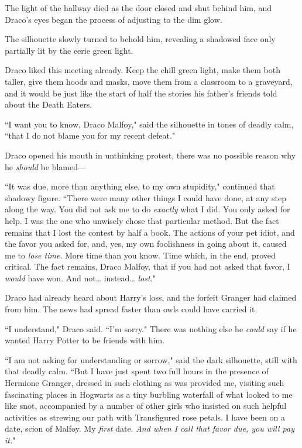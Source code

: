 The light of the hallway died as the door closed and shut behind him, and Draco's eyes began the process of adjusting to the dim glow.

The silhouette slowly turned to behold him, revealing a shadowed face only partially lit by the eerie green light.

Draco liked this meeting already. Keep the chill green light, make them both taller, give them hoods and masks, move them from a classroom to a graveyard, and it would be just like the start of half the stories his father's friends told about the Death Eaters.

``I want you to know, Draco Malfoy," said the silhouette in tones of deadly calm, ``that I do not blame you for my recent defeat."

Draco opened his mouth in unthinking protest, there was no possible reason why he \emph{should} be blamed---

``It was due, more than anything else, to my own stupidity," continued that shadowy figure. ``There were many other things I could have done, at any step along the way. You did not ask me to do \emph{exactly} what I did. You only asked for help. I was the one who unwisely chose that particular method. But the fact remains that I lost the contest by half a book. The actions of your pet idiot, and the favor you asked for, and, yes, my own foolishness in going about it, caused me to \emph{lose time}. More time than you know. Time which, in the end, proved critical. The fact remains, Draco Malfoy, that if you had not asked that favor, I \emph{would} have won. And not{\ldots} instead{\ldots} \emph{lost}."

Draco had already heard about Harry's loss, and the forfeit Granger had claimed from him. The news had spread faster than owls could have carried it.

``I understand," Draco said. ``I'm sorry." There was nothing else he \emph{could} say if he wanted Harry Potter to be friends with him.

``I am not asking for understanding or sorrow," said the dark silhouette, still with that deadly calm. ``But I have just spent two full hours in the presence of Hermione Granger, dressed in such clothing as was provided me, visiting such fascinating places in Hogwarts as a tiny burbling waterfall of what looked to me like snot, accompanied by a number of other girls who insisted on such helpful activities as strewing our path with Transfigured rose petals. I have been on a date, scion of Malfoy. My \emph{first} date. \emph{And when I call that favor due, you will pay it.}"

